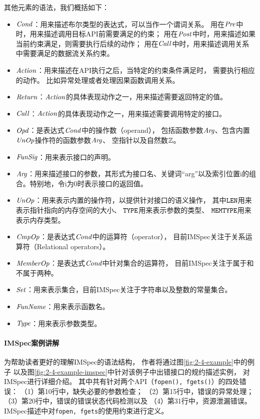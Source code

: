 

其他元素的语法，我们概括如下：
\begin{itemize}
	\item $\mathit{Cond}$：用来描述布尔类型的表达式，可以当作一个谓词关系。
	用在$\mathit{Pre}$中时，用来描述调用目标API前需要满足的约束；
	用在$\mathit{Post}$中时，用来描述如果当前约束满足，则需要执行后续的动作；
	用在$\mathit{Call}$中时，用来描述调用关系中需要满足的数据流关系约束。
	\item $\mathit{Action}$：用来描述在API执行之后，当特定的约束条件满足时，
	需要执行相应的动作。
	比如异常处理或者处理因果函数调用关系。
	\item $\mathit{Return}$：$\mathit{Action}$的具体表现动作之一，用来描述需要返回特定的值。
	\item $\mathit{Call}$：$\mathit{Action}$的具体表现动作之一，用来描述需要调用特定的接口。
	\item $\mathit{Opd}$：是表达式$\mathit{Cond}$中的操作数（operand），
	包括函数参数$\mathit{Arg}$、包含内置$\mathit{UnOp}$操作符的函数参数$\mathit{Arg}$、
	空指针以及自然数$\mathbb{Z}$。
	\item $\mathit{FunSig}$：用来表示接口的声明。
	\item $\mathit{Arg}$：用来描述接口的参数，其形式为接口名、关键词“arg”以及索引位置i的组合。特别地，令i为0时表示接口的返回值。
	\item $\mathit{UnOp}$：用来表示内置的操作符，以提供针对接口的语义操作，
	其中\textbf{$\texttt{LEN}$}用来表示指针指向的内存空间的大小、
	\textbf{$\texttt{TYPE}$}用来表示参数的类型、
	\textbf{$\texttt{MEMTYPE}$}用来表示内存类型。
	\item $\mathit{CmpOp}$：是表达式$\mathit{Cond}$中的运算符（operator），
	目前IMSpec关注于关系运算符（Relational operators）。
	\item $\mathit{MemberOp}$：是表达式$\mathit{Cond}$中针对集合的运算符，
	目前IMSpec关注于属于和不属于两种。
	\item $\mathit{Set}$：用来表示集合，目前IMSpec关注于字符串以及整数的常量集合。
	\item $\mathit{FunName}$：用来表示函数名。
	\item $\mathit{Type}$：用来表示参数类型。
\end{itemize}



\paragraph{IMSpec案例讲解}
为帮助读者更好的理解IMSpec的语法结构，
作者将通过图\ref{fig:2-4-example}中的例子
以及图\ref{fig:2-4-example-imspec}中针对该例子中出错接口的规约描述实例，
对IMSpec进行详细介绍。
其中共有针对两个API（\texttt{fopen(), fgets()}）的四处错误：
（1）第10行中，缺失必要的参数检查；
（2）第15行中，错误的异常处理；
（3）第20行中，错误的错误状态代码检测以及
（4）第31行中，资源泄漏错误。
IMSpec描述中对\texttt{fopen, fgets}的使用约束进行定义。

